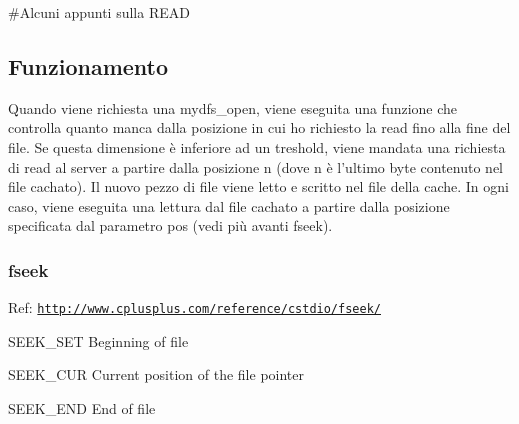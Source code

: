 \#\+Alcuni appunti sulla R\+E\+A\+D \subsection*{Funzionamento}

Quando viene richiesta una mydfs\+\_\+open, viene eseguita una funzione che controlla quanto manca dalla posizione in cui ho richiesto la read fino alla fine del file. Se questa dimensione è inferiore ad un treshold, viene mandata una richiesta di read al server a partire dalla posizione n (dove n è l'ultimo byte contenuto nel file cachato). Il nuovo pezzo di file viene letto e scritto nel file della cache. In ogni caso, viene eseguita una lettura dal file cachato a partire dalla posizione specificata dal parametro pos (vedi più avanti fseek).

\subsubsection*{fseek}

Ref\+: \href{http://www.cplusplus.com/reference/cstdio/fseek/}{\tt http\+://www.\+cplusplus.\+com/reference/cstdio/fseek/}


\begin{DoxyItemize}
\item S\+E\+E\+K\+\_\+\+S\+E\+T Beginning of file
\item S\+E\+E\+K\+\_\+\+C\+U\+R Current position of the file pointer
\item S\+E\+E\+K\+\_\+\+E\+N\+D End of file 
\end{DoxyItemize}